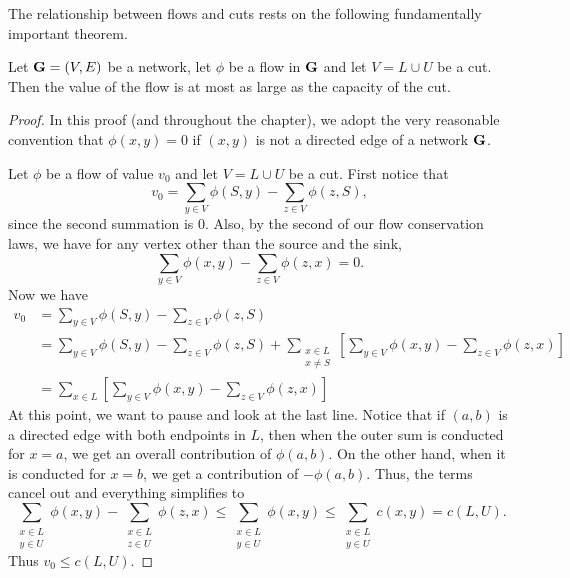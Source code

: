 The relationship between flows and cuts rests on the following
fundamentally important theorem.

\begin{theorem}\label{thm:networkflow:flowleqcut}
Let $\mathbf{G}=(V,E)$ be a network, let $\phi$ be a flow in $\mathbf{G}$ and let 
$V=L\cup U$ be a cut. Then the value of the flow is at most as
large as the capacity of the cut.
\end{theorem}
\begin{proof}
  In this proof (and throughout the chapter), we adopt the very
  reasonable convention that $\phi(x,y)=0$ if $(x,y)$ is not a
  directed edge of a network $\mathbf{G}$. 

  Let $\phi$ be a flow of value $v_0$ and let $V=L\cup U$ be a
  cut. First notice that
  \[v_0 = \sum_{y\in V} \phi(S,y) - \sum_{z\in V}\phi(z,S),\]
  since the second summation is $0$. Also, by the second of our flow
  conservation laws, we have for any vertex other than the source and
  the sink,
  \[\sum_{y\in V}\phi(x,y) -\sum_{z\in V}\phi(z,x) = 0.\]
  Now we have
  \begin{align*}
    v_0 &= \sum_{y\in V} \phi(S,y) - \sum_{z\in V}\phi(z,S)\\
    &= \sum_{y\in V} \phi(S,y) - \sum_{z\in V}\phi(z,S) +
    \sum_{\substack{x\in L\\x\neq S}}\left[\sum_{y\in V} \phi(x,y) -
      \sum_{z\in V}\phi(z,x)\right]\\
    &= \sum_{x\in L}\left[\sum_{y\in V} \phi(x,y) -
      \sum_{z\in V}\phi(z,x)\right]
  \end{align*}
  At this point, we want to pause and look at the last line. Notice
  that if $(a,b)$ is a directed edge with both endpoints in $L$, then
  when the outer sum is conducted for $x=a$, we get an overall
  contribution of $\phi(a,b)$. On the other hand, when it is conducted
  for $x=b$, we get a contribution of $-\phi(a,b)$. Thus, the terms
  cancel out and everything simplifies to
  \[\sum_{\substack{x\in L\\y\in U}} \phi(x,y) - \sum_{\substack{x\in
      L\\ z\in U}} \phi(z,x)\leq \sum_{\substack{x\in L\\y\in U}}
  \phi(x,y)\leq \sum_{\substack{x\in L\\y\in U}} c(x,y)=c(L,U).\]
  Thus $v_0\leq c(L,U)$.
\end{proof}

